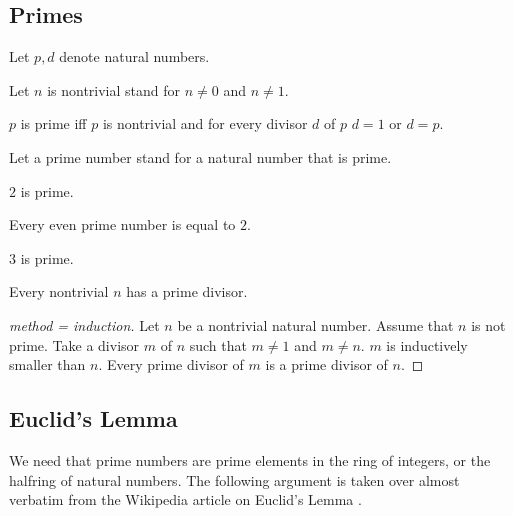 \documentclass[11pt]{article}
\begin{document}
\subsection{Primes}

\begin{forthel}

Let $p,d$ denote natural numbers.

Let $n$ is nontrivial stand for $n \neq 0$ and $n \neq 1$.

\begin{definition}
$p$ is prime iff $p$ is nontrivial and
for every divisor $d$ of $p$ $d = 1$ or $d = p$.
\end{definition}
Let a prime number stand for a natural number that is prime.

\begin{lemma} $2$ is prime.
\end{lemma}

\begin{lemma}
Every even prime number is equal to $2$.
\end{lemma}

\begin{lemma} $3$ is prime.
\end{lemma}

\begin{lemma}
Every nontrivial $n$ has a prime divisor.
\end{lemma}
\begin{proof}[method = induction]
Let $n$ be a nontrivial natural number.
Assume that $n$ is not prime.
Take a divisor $m$ of $n$ such that $m \neq 1$ and $m \neq n$.
$m$ is inductively smaller than $n$.
Every prime divisor of $m$ is a prime divisor of $n$.
\end{proof}
\end{forthel}

\subsection{Euclid's Lemma}

We need that prime numbers are prime 
elements in the ring of integers, or the halfring of natural numbers.
The following argument is taken over almost verbatim from 
the Wikipedia article on Euclid's Lemma
\cite{wikipedia}.
\end{document}
